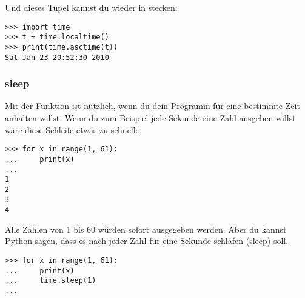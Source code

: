 \noindent
Und dieses Tupel kannst du wieder in  stecken:

\begin{Verbatim}[frame=single]
>>> import time
>>> t = time.localtime()
>>> print(time.asctime(t))
Sat Jan 23 20:52:30 2010
\end{Verbatim}

\noindent
\subsubsection*{sleep}
Mit der Funktion  ist nützlich, wenn du dein Programm für eine bestimmte Zeit anhalten willst. Wenn du zum Beispiel jede Sekunde eine Zahl ausgeben willst wäre diese Schleife etwas zu schnell:

\begin{Verbatim}[frame=single]
>>> for x in range(1, 61):
...     print(x)
...
1
2
3
4
\end{Verbatim}

Alle Zahlen von 1 bis 60 würden sofort ausgegeben werden. Aber du kannst Python sagen, dass es nach jeder Zahl für eine Sekunde schlafen (sleep) soll.

\begin{Verbatim}[frame=single]
>>> for x in range(1, 61):
...     print(x)
...     time.sleep(1)
...
\end{Verbatim}

